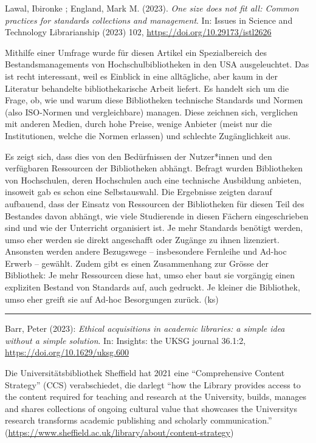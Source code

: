 \documentclass[a4paper,
fontsize=11pt,
oneside,
numbers=noperiodatend,
parskip=half-,
bibliography=totoc,
final
]{scrartcl}
\begin{document}
Lawal, Ibironke ; England, Mark M. (2023). \emph{One size does not fit
all: Common practices for standards collections and management}. In:
Issues in Science and Technology Librarianship (2023) 102,
\url{https://doi.org/10.29173/istl2626}

Mithilfe einer Umfrage wurde für diesen Artikel ein Spezialbereich des
Bestandsmanagements von Hochschulbibliotheken in den USA ausgeleuchtet.
Das ist recht interessant, weil es Einblick in eine alltägliche, aber
kaum in der Literatur behandelte bibliothekarische Arbeit liefert. Es
handelt sich um die Frage, ob, wie und warum diese Bibliotheken
technische Standards und Normen (also ISO-Normen und vergleichbare)
managen. Diese zeichnen sich, verglichen mit anderen Medien, durch hohe
Preise, wenige Anbieter (meist nur die Institutionen, welche die Normen
erlassen) und schlechte Zugänglichkeit aus.

Es zeigt sich, dass dies von den Bedürfnissen der Nutzer*innen und den
verfügbaren Ressourcen der Bibliotheken abhängt. Befragt wurden
Bibliotheken von Hochschulen, deren Hochschulen auch eine technische
Ausbildung anbieten, insoweit gab es schon eine Selbstauswahl. Die
Ergebnisse zeigten darauf aufbauend, dass der Einsatz von Ressourcen der
Bibliotheken für diesen Teil des Bestandes davon abhängt, wie viele
Studierende in diesen Fächern eingeschrieben sind und wie der Unterricht
organisiert ist. Je mehr Standards benötigt werden, umso eher werden sie
direkt angeschafft oder Zugänge zu ihnen lizenziert. Ansonsten werden
andere Bezugswege -- insbesondere Fernleihe und Ad-hoc Erwerb --
gewählt. Zudem gibt es einen Zusammenhang zur Grösse der Bibliothek: Je
mehr Ressourcen diese hat, umso eher baut sie vorgängig einen expliziten
Bestand von Standards auf, auch gedruckt. Je kleiner die Bibliothek,
umso eher greift sie auf Ad-hoc Besorgungen zurück. (ks)

\begin{center}\rule{0.5\linewidth}{0.5pt}\end{center}

Barr, Peter (2023): \emph{Ethical acquisitions in academic libraries: a
simple idea without a simple solution}. In: Insights: the UKSG journal
36.1:2, \url{https://doi.org/10.1629/uksg.600}

Die Universitätsbibliothek Sheffield hat 2021 eine
\enquote{Comprehensive Content Strategy} (CCS) verabschiedet, die
darlegt \enquote{how the Library provides access to the content required
for teaching and research at the University, builds, manages and shares
collections of ongoing cultural value that showcases the
University\textquotesingle s research transforms academic publishing and
scholarly communication.}
(\url{https://www.sheffield.ac.uk/library/about/content-strategy})
\end{document}
